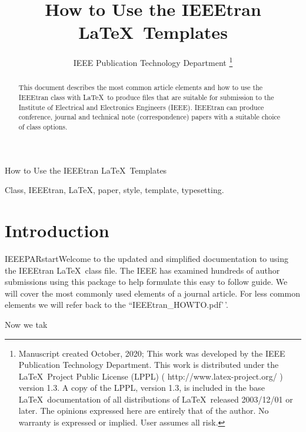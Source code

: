 \documentclass[
  lettersize,
  journal]{IEEEtran}
\author{}
\date{}
\begin{document}

\title{How to Use the IEEEtran \LaTeX \ Templates}
\author{IEEE Publication Technology Department
\thanks{Manuscript created October, 2020; This work was developed by the IEEE Publication Technology Department. This work is distributed under the \LaTeX \ Project Public License (LPPL) ( http://www.latex-project.org/ ) version 1.3. A copy of the LPPL, version 1.3, is included in the base \LaTeX \ documentation of all distributions of \LaTeX \ released 2003/12/01 or later. The opinions expressed here are entirely that of the author. No warranty is expressed or implied. User assumes all risk.}}

%
{How to Use the IEEEtran \LaTeX \ Templates}

\maketitle
\begin{abstract}
This document describes the most common article elements and how to use the IEEEtran class with \LaTeX \ to produce files that are suitable for submission to the Institute of Electrical and Electronics Engineers (IEEE).  IEEEtran can produce conference, journal and technical note (correspondence) papers with a suitable choice of class options.
\end{abstract}

\begin{IEEEkeywords}
Class, IEEEtran, \LaTeX, paper, style, template, typesetting.
\end{IEEEkeywords}


\section{Introduction}\label{introduction}

IEEEPARstart{W}{elcome} to the updated and simplified documentation to
using the IEEEtran \LaTeX ~class file. The IEEE has examined hundreds of
author submissions using this package to help formulate this easy to
follow guide. We will cover the most commonly used elements of a journal
article. For less common elements we will refer back to the
``IEEEtran\_HOWTO.pdf'\,'.

Now we tak



\end{document}
